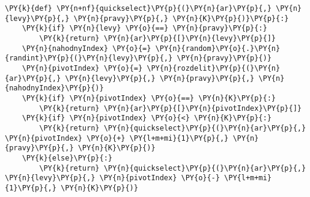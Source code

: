 \begin{Verbatim}[commandchars=\\\{\}]
\PY{k}{def} \PY{n+nf}{quickselect}\PY{p}{(}\PY{n}{ar}\PY{p}{,} \PY{n}{levy}\PY{p}{,} \PY{n}{pravy}\PY{p}{,} \PY{n}{K}\PY{p}{)}\PY{p}{:}
	\PY{k}{if} \PY{n}{levy} \PY{o}{==} \PY{n}{pravy}\PY{p}{:}
		\PY{k}{return} \PY{n}{ar}\PY{p}{[}\PY{n}{levy}\PY{p}{]}
	\PY{n}{nahodnyIndex} \PY{o}{=} \PY{n}{random}\PY{o}{.}\PY{n}{randint}\PY{p}{(}\PY{n}{levy}\PY{p}{,} \PY{n}{pravy}\PY{p}{)}
	\PY{n}{pivotIndex} \PY{o}{=} \PY{n}{rozdelit}\PY{p}{(}\PY{n}{ar}\PY{p}{,} \PY{n}{levy}\PY{p}{,} \PY{n}{pravy}\PY{p}{,} \PY{n}{nahodnyIndex}\PY{p}{)}
	\PY{k}{if} \PY{n}{pivotIndex} \PY{o}{==} \PY{n}{K}\PY{p}{:}
		\PY{k}{return} \PY{n}{ar}\PY{p}{[}\PY{n}{pivotIndex}\PY{p}{]}
	\PY{k}{if} \PY{n}{pivotIndex} \PY{o}{<} \PY{n}{K}\PY{p}{:}
		\PY{k}{return} \PY{n}{quickselect}\PY{p}{(}\PY{n}{ar}\PY{p}{,} \PY{n}{pivotIndex} \PY{o}{+} \PY{l+m+mi}{1}\PY{p}{,} \PY{n}{pravy}\PY{p}{,} \PY{n}{K}\PY{p}{)}
	\PY{k}{else}\PY{p}{:}
		\PY{k}{return} \PY{n}{quickselect}\PY{p}{(}\PY{n}{ar}\PY{p}{,} \PY{n}{levy}\PY{p}{,} \PY{n}{pivotIndex} \PY{o}{-} \PY{l+m+mi}{1}\PY{p}{,} \PY{n}{K}\PY{p}{)}
\end{Verbatim}

